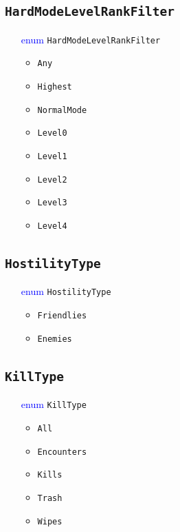 \documentclass[10pt, a4paper]{memoir}
\numberwithin{equation}{section}
\theoremstyle{plain}
\theoremstyle{defp}
\theoremstyle{dotless}
\theoremstyle{definition}
\theoremstyle{dotless}
\theoremstyle{dotless}
\theoremstyle{defp}
\theoremstyle{defp}
\theoremstyle{be}          %
\theoremstyle{defp}
\newcommand\ttt[1]{\texttt{#1}}
\begin{document}
\subsection{\ttt{HardModeLevelRankFilter}}\label{sec:HardModeLevelRankFilter}
\begin{itemize}[noitemsep,topsep=1pt]
\item[\textcolor{blue}{enum}] \ttt{HardModeLevelRankFilter}
\begin{itemize}[itemsep=1pt,topsep=1pt]
\item \ttt{Any}
\item \ttt{Highest}
\item \ttt{NormalMode}
\item \ttt{Level0}
\item \ttt{Level1}
\item \ttt{Level2}
\item \ttt{Level3}
\item \ttt{Level4}
\end{itemize}
\end{itemize}


\subsection{\ttt{HostilityType}}\label{sec:HostilityType}
\begin{itemize}[noitemsep,topsep=1pt]
\item[\textcolor{blue}{enum}] \ttt{HostilityType}
\begin{itemize}[itemsep=1pt,topsep=1pt]
\item \ttt{Friendlies}
\item \ttt{Enemies}
\end{itemize}
\end{itemize}


\subsection{\ttt{KillType}}\label{sec:KillType}
\begin{itemize}[noitemsep,topsep=1pt]
\item[\textcolor{blue}{enum}] \ttt{KillType}
\begin{itemize}[itemsep=1pt,topsep=1pt]
\item \ttt{All}
\item \ttt{Encounters}
\item \ttt{Kills}
\item \ttt{Trash}
\item \ttt{Wipes}
\end{itemize}
\end{itemize}
\end{document}

